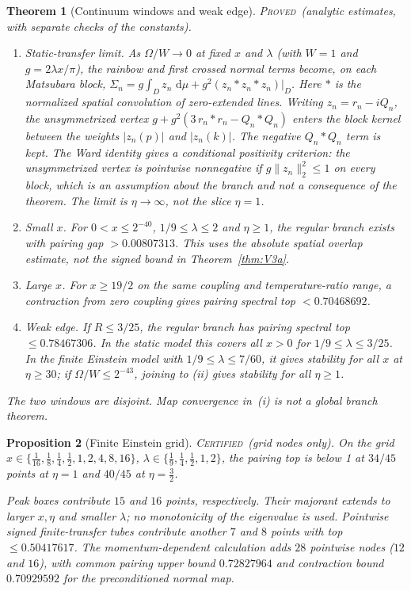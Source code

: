 \documentclass[11pt]{article}
\newcommand{\PROVED}{\upshape\mdseries\textsc{Proved}}
\newcommand{\CERT}{\upshape\mdseries\textsc{Certified}}
\newcommand{\dd}{\,\mathrm d}
\newtheorem{theorem}{Theorem}[section]
\newtheorem{proposition}[theorem]{Proposition}
\theoremstyle{definition}
\theoremstyle{remark}
\begin{document}
\begin{theorem}[Continuum windows and weak edge]\label{thm:V4}
\noindent\PROVED\ (analytic estimates, with separate checks of the constants).
\begin{enumerate}
\item[(i)] \emph{Static-transfer limit.} As $\Omega/W\to0$ at fixed $x$ and $\lambda$ (with $W=1$ and $g=2\lambda x/\pi$), the rainbow and first crossed normal terms become, on each Matsubara block, $\Sigma_n=g\!\int_D z_n\,\dd\mu+g^2(z_n*z_n*z_n)|_D$. Here $*$ is the normalized spatial convolution of zero-extended lines. Writing $z_n=r_n-iQ_n$, the unsymmetrized vertex $g+g^2(3\,r_n*r_n-Q_n*Q_n)$ enters the block kernel between the weights $|z_n(p)|$ and $|z_n(k)|$. The negative $Q_n*Q_n$ term is kept. The Ward identity gives a conditional positivity criterion: the unsymmetrized vertex is pointwise nonnegative if $g\|z_n\|_2^2\le1$ on every block, which is an assumption about the branch and not a consequence of the theorem. The limit is $\eta\to\infty$, not the slice $\eta=1$.
\item[(ii)] \emph{Small $x$.} For $0<x\le2^{-40}$, $1/9\le\lambda\le2$ and $\eta\ge1$, the regular branch exists with pairing gap $>0.00807313$. This uses the absolute spatial overlap estimate, not the signed bound in Theorem~\ref{thm:V3a}.
\item[(iii)] \emph{Large $x$.} For $x\ge19/2$ on the same coupling and temperature-ratio range, a contraction from zero coupling gives pairing spectral top $<0.70468692$.
\item[(iv)] \emph{Weak edge.} If $R\le3/25$, the regular branch has pairing spectral top $\le0.78467306$. In the static model this covers all $x>0$ for $1/9\le\lambda\le3/25$. In the finite Einstein model with $1/9\le\lambda\le7/60$, it gives stability for all $x$ at $\eta\ge30$; if $\Omega/W\le2^{-43}$, joining to (ii) gives stability for all $\eta\ge1$.
\end{enumerate}
The two windows are disjoint. Map convergence in~(i) is not a global branch theorem.
\end{theorem}

\begin{proposition}[Finite Einstein grid]\label{prop:V4grid}
\noindent\CERT\ (grid nodes only). On the grid $x\in\{\tfrac1{16},\tfrac18,\tfrac14,\tfrac12,1,2,4,8,16\}$, $\lambda\in\{\tfrac19,\tfrac14,\tfrac12,1,2\}$, the pairing top is below 1 at $34/45$ points at $\eta=1$ and $40/45$ at $\eta=\tfrac32$.

Peak boxes contribute $15$ and $16$ points, respectively. Their majorant extends to larger $x,\eta$ and smaller $\lambda$; no monotonicity of the eigenvalue is used. Pointwise signed finite-transfer tubes contribute another $7$ and $8$ points with top $\le0.50417617$. The momentum-dependent calculation adds $28$ pointwise nodes ($12$ and $16$), with common pairing upper bound $0.72827964$ and contraction bound $0.70929592$ for the preconditioned normal map.
\end{proposition}
\end{document}
